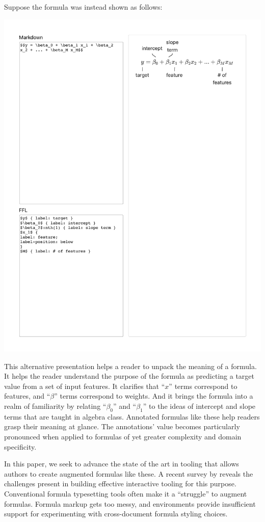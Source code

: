 Suppose the formula was instead shown as follows:

\begin{center}
\vspace{0.5ex}
\includegraphics[width=0.65\linewidth]{figures/aug-intro}
\vspace{0.5ex}
\end{center}

This alternative presentation helps a reader to unpack the meaning of a formula. It helps the reader understand the purpose of the formula as predicting a target value from a set of input features. It clarifies that ``$x$'' terms correspond to features, and ``$\beta$'' terms correspond to weights. And it brings the formula into a realm of familiarity by relating ``$\beta_0$'' and ``$\beta_1$'' to the ideas of intercept and slope terms that are taught in algebra class.
Annotated formulas like these help readers grasp their meaning at glance. The annotations' value becomes particularly pronounced when applied to formulas of yet greater complexity and domain specificity.

In this paper, we seek to advance the state of the art in tooling that allows authors to create augmented formulas like these. A recent survey by \citet{ref:head2022math} reveals the challenges present in building effective interactive tooling for this purpose. Conventional formula typesetting tools often make it a ``struggle'' to augment formulas. Formula markup gets too messy, and environments provide insufficient support for experimenting with cross-document formula styling choices.

